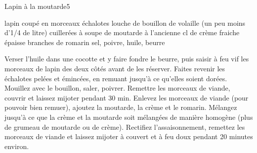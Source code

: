 \begin{recette}{Lapin à la moutarde}{5}{}{}
\begin{ingredients}[6 pers.]
 lapin coupé en morceaux
 échalotes
 louche de bouillon de volaille (un peu moins d'1/4 de litre)
 cuillerées à soupe de moutarde à l'ancienne
 cl de crème fraiche épaisse
 branches de romarin
\ingredient sel, poivre, huile, beurre
\end{ingredients}

\begin{preparation}
\etape Verser l'huile dans une cocotte et y faire fondre le beurre, puis saisir à feu vif les morceaux de lapin des deux côtés avant de les réserver.
\etape Faites revenir les échalotes pelées et émincées, en remuant jusqu'à ce qu'elles soient dorées.
\etape Mouillez avec le bouillon, saler, poivrer. Remettre les morceaux de viande, couvrir et laissez mijoter pendant 30 min.
\etape Enlevez les morceaux de viande (pour pouvoir bien remuer), ajoutez la moutarde, la crème et le romarin. Mélangez jusqu'à ce que la crème et la moutarde soit mélangées de manière homogène (plus de grumeau de moutarde ou de crème). 
\etape Rectifiez l'assaisonnement, remettez les morceaux de viande et laissez mijoter à couvert et à feu doux pendant 20 minutes environ.
\end{preparation}


\end{recette}

